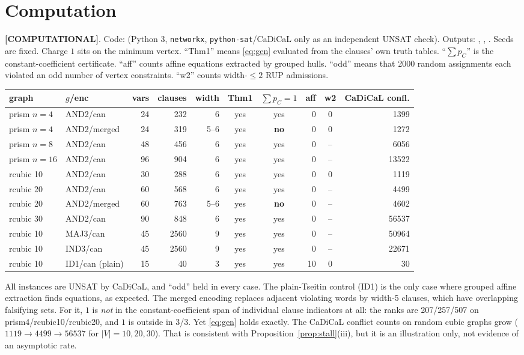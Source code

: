 \documentclass[11pt]{article}
\theoremstyle{definition}
\theoremstyle{remark}
\newcommand{\lab}[1]{\textbf{[#1]}}
\begin{document}
\section{Computation}\label{sec:comp}
\lab{COMPUTATIONAL}. Code: 
(Python 3, \texttt{networkx}, \texttt{python-sat}/CaDiCaL only as an independent UNSAT check).
Outputs: , ,
. Seeds are fixed. Charge $1$ sits on the minimum
vertex. ``Thm1'' means \eqref{eq:gen} evaluated from the clauses' own truth tables. ``$\sum p_C$''
is the constant-coefficient certificate. ``aff'' counts affine equations extracted by
grouped hulls. ``odd'' means that 2000 random assignments each violated an odd number of
vertex constraints. ``w2'' counts width-$\le2$ RUP admissions.
\begin{center}\small
\begin{tabular}{llrrrccrcr}
\toprule
graph & $g$/enc & vars & clauses & width & Thm1 & $\sum p_C=1$ & aff & w2 & CaDiCaL confl.\\
\midrule
prism $n{=}4$ & AND2/can & 24 & 232 & 6 & yes & yes & 0 & 0 & 1399\\
prism $n{=}4$ & AND2/merged & 24 & 319 & 5--6 & yes & \textbf{no} & 0 & 0 & 1272\\
prism $n{=}8$ & AND2/can & 48 & 456 & 6 & yes & yes & 0 & -- & 6056\\
prism $n{=}16$ & AND2/can & 96 & 904 & 6 & yes & yes & 0 & -- & 13522\\
rcubic 10 & AND2/can & 30 & 288 & 6 & yes & yes & 0 & 0 & 1119\\
rcubic 20 & AND2/can & 60 & 568 & 6 & yes & yes & 0 & -- & 4499\\
rcubic 20 & AND2/merged & 60 & 763 & 5--6 & yes & \textbf{no} & 0 & -- & 4602\\
rcubic 30 & AND2/can & 90 & 848 & 6 & yes & yes & 0 & -- & 56537\\
rcubic 10 & MAJ3/can & 45 & 2560 & 9 & yes & yes & 0 & -- & 50964\\
rcubic 10 & IND3/can & 45 & 2560 & 9 & yes & yes & 0 & -- & 22671\\
rcubic 10 & ID1/can (plain) & 15 & 40 & 3 & yes & yes & 10 & 0 & 30\\
\bottomrule
\end{tabular}
\end{center}
All instances are UNSAT by CaDiCaL, and ``odd'' held in every case. The plain-Tseitin control
(ID1) is the only case where grouped affine extraction finds equations, as expected. The
merged encoding replaces adjacent violating words by width-5 clauses, which have overlapping
falsifying sets. For it, $1$ is \emph{not} in the constant-coefficient span of individual
clause indicators at all: the ranks are 207/257/507 on prism4/rcubic10/rcubic20, and $1$ is
outside in 3/3. Yet \eqref{eq:gen} holds exactly. The CaDiCaL conflict counts on random cubic
graphs grow ($1119\to4499\to56537$ for $|V|=10,20,30$). That is consistent with
Proposition~\ref{prop:stall}(iii), but it is an illustration only, not evidence of an
asymptotic rate.
\end{document}
